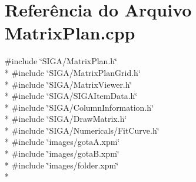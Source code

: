 \section{Referência do Arquivo Matrix\+Plan.\+cpp}
\label{_matrix_plan_8cpp}
{\ttfamily \#include \char`\"{}S\+I\+G\+A/\+Matrix\+Plan.\+h\char`\"{}}\\*
{\ttfamily \#include \char`\"{}S\+I\+G\+A/\+Matrix\+Plan\+Grid.\+h\char`\"{}}\\*
{\ttfamily \#include \char`\"{}S\+I\+G\+A/\+Matrix\+Viewer.\+h\char`\"{}}\\*
{\ttfamily \#include \char`\"{}S\+I\+G\+A/\+S\+I\+G\+A\+Item\+Data.\+h\char`\"{}}\\*
{\ttfamily \#include \char`\"{}S\+I\+G\+A/\+Column\+Information.\+h\char`\"{}}\\*
{\ttfamily \#include \char`\"{}S\+I\+G\+A/\+Draw\+Matrix.\+h\char`\"{}}\\*
{\ttfamily \#include \char`\"{}S\+I\+G\+A/\+Numericals/\+Fit\+Curve.\+h\char`\"{}}\\*
{\ttfamily \#include \char`\"{}images/gota\+A.\+xpm\char`\"{}}\\*
{\ttfamily \#include \char`\"{}images/gota\+B.\+xpm\char`\"{}}\\*
{\ttfamily \#include \char`\"{}images/folder.\+xpm\char`\"{}}\\*
